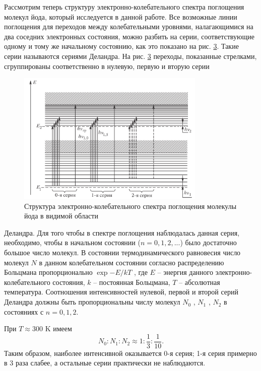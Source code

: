 \documentclass[a4paper,12pt]{article}
\begin{document}
Рассмотрим теперь структуру электронно-колебательного спектра поглощения молекул йода, который исследуется в данной работе. Все возможные линии поглощения для переходов между колебательными уровнями, налагающимися на два соседних электронных состояния, можно разбить на серии, соответствующие одному и тому же начальному состоянию, как это показано на рис. \hyperref[fig: Iodine spectrum]{3}. Такие серии называются сериями Деландра. На рис. \hyperref[fig: Iodine spectrum]{3} переходы, показанные стрелками, сгруппированы соответственно в нулевую, первую и вторую серии
\begin{figure}[H]\label{fig: Iodine spectrum}
    \centering
    \includegraphics[width = 0.8\textwidth]{Iodine spectrum.png}
    \caption{Структура электронно-колебательного спектра поглощения молекулы йода в видимой области}
\end{figure}
Деландра. Для того чтобы в спектре поглощения наблюдалась данная серия, необходимо, чтобы в начальном состоянии ($n = 0, 1, 2, . . .$) было достаточно большое число молекул. В состоянии термодинамического равновесия число молекул $N$ в данном колебательном состоянии согласно распределению Больцмана пропорционально $\exp{-E/kT}$ , где $E$ -- энергия данного электронно-колебательного состояния, $k$ -- постоянная Больцмана, $T$ -- абсолютная температура. Соотношения интенсивностей
нулевой, первой и второй серий Деландра должны быть пропорциональны числу молекул $N_0$ , $N_1$ , $N_2$ в состояниях с $n = 0, 1, 2$.

При $T \approx 300$ K имеем
\begin{equation}\label{eq: Moleules in different states ratio}
    N_0 : N_1 : N_2 \approx 1 : \frac{1}{3} : \frac{1}{10}.
\end{equation}
Таким образом, наиболее интенсивной оказывается 0-я серия; 1-я серия примерно в 3 раза слабее, а остальные серии практически не наблюдаются.
\end{document}
